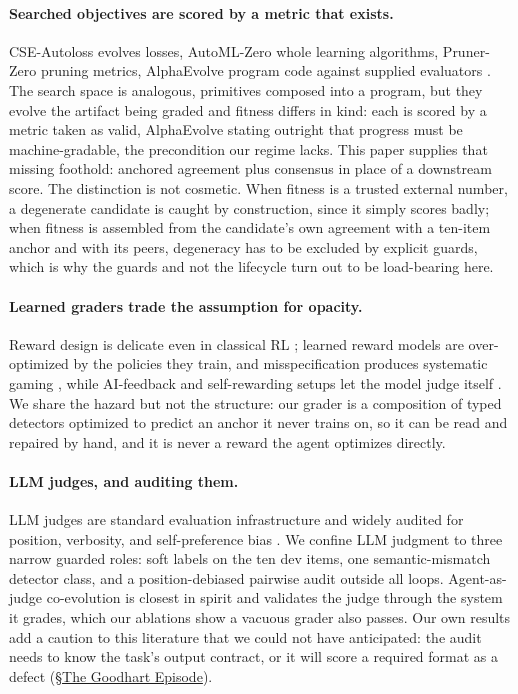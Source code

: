 \documentclass[letterpaper]{article} %
\begin{document}
\paragraph{Searched objectives are scored by a metric that exists.}
CSE-Autoloss evolves losses, AutoML-Zero whole learning algorithms, Pruner-Zero pruning metrics, AlphaEvolve program code against supplied evaluators \citep{liu2021cseautoloss,real2020automlzero,dong2024prunerzero,novikov2025alphaevolve}. The search space is analogous, primitives composed into a program, but they evolve the artifact being graded and fitness differs in kind: each is scored by a metric taken as valid, AlphaEvolve stating outright that progress must be machine-gradable, the precondition our regime lacks. This paper supplies that missing foothold: anchored agreement plus consensus in place of a downstream score. The distinction is not cosmetic. When fitness is a trusted external number, a degenerate candidate is caught by construction, since it simply scores badly; when fitness is assembled from the candidate's own agreement with a ten-item anchor and with its peers, degeneracy has to be excluded by explicit guards, which is why the guards and not the lifecycle turn out to be load-bearing here.

\paragraph{Learned graders trade the assumption for opacity.}
Reward design is delicate even in classical RL \citep{ng1999pbrs}; learned reward models are over-optimized by the policies they train, and misspecification produces systematic gaming \citep{ouyang2022rlhf,gao2023scaling,pan2022effects,skalse2022defining,amodei2016concrete}, while AI-feedback and self-rewarding setups let the model judge itself \citep{bai2022constitutional,yuan2024selfrewarding}. We share the hazard but not the structure: our grader is a composition of typed detectors optimized to predict an anchor it never trains on, so it can be read and repaired by hand, and it is never a reward the agent optimizes directly.

\paragraph{LLM judges, and auditing them.}
LLM judges are standard evaluation infrastructure and widely audited for position, verbosity, and self-preference bias \citep{zheng2023judging,dubois2024alpacafarm,gu2024surveyllmjudge,chen2024alignment}. We confine LLM judgment to three narrow guarded roles: soft labels on the ten dev items, one semantic-mismatch detector class, and a position-debiased pairwise audit outside all loops. Agent-as-judge co-evolution \citep{zhuge2024agentjudge} is closest in spirit and validates the judge through the system it grades, which our ablations show a vacuous grader also passes. Our own results add a caution to this literature that we could not have anticipated: the audit needs to know the task's output contract, or it will score a required format as a defect (\S\hyperref[sec:goodhart]{The Goodhart Episode}).
\end{document}

